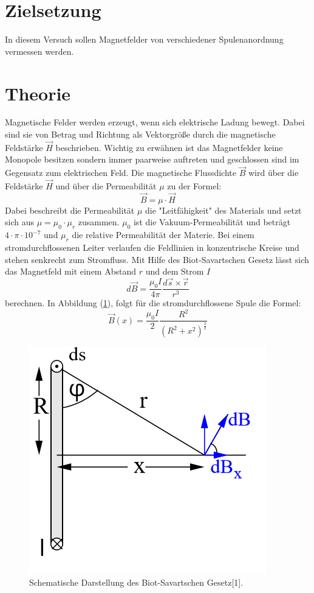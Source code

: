 \section{Zielsetzung}
In diesem Versuch sollen Magnetfelder von verschiedener Spulenanordnung vermessen werden.
\section{Theorie}
Magnetische Felder werden erzeugt, wenn sich elektrische Ladung bewegt.
Dabei sind sie von Betrag und Richtung als Vektorgröße durch die magnetische Feldstärke
$\vec{H}$ beschrieben. Wichtig zu erwähnen ist das Magnetfelder keine Monopole besitzen
sondern immer paarweise auftreten und geschlossen sind im Gegensatz zum elektrischen Feld.
Die magnetische Flussdichte $\vec{B}$ wird über die Feldstärke $\vec{H}$ und über die
Permeabilität $\mu$ zu der Formel:
\begin{equation}
  \vec{B} = \mu \cdot \vec{H}
  \label{eq:1}
\end{equation}
Dabei beschreibt die Permeabilität $\mu$ die "Leitfähigkeit" des Materials und setzt sich
aus $\mu = \mu_0 \cdot \mu_r$ zusammen. $\mu_0$ ist die Vakuum-Permeabilität und beträgt $4 \cdot \pi \cdot 10^{-7}$
und $\mu_r$ die relative Permeabilität der Materie.
Bei einem stromdurchflossenen Leiter verlaufen die Feldlinien in konzentrische Kreise und
stehen senkrecht zum Stromfluss. Mit Hilfe des Biot-Savartschen Gesetz lässt sich
das Magnetfeld mit einem Abstand $r$ und dem Strom $I$
\begin{equation*}
  d\vec{B} = \frac{\mu_0 I}{4\pi} \frac{d\vec{s} \times \vec{r}}{r^3}
\end{equation*}
berechnen. In Abbildung (\ref{abb:1}), folgt für die stromdurchflossene Spule die Formel:
\begin{equation}
  \vec{B}(x) = \frac{\mu_0 I}{2} \frac{R^2}{(R^2 + x^2)^{\frac{3}{2}}}
  \label{eq:2}
\end{equation}
\begin{figure}[H]
  \centering
  \includegraphics[width=5 cm , height=3.5 cm]{Abb1.png}
	\caption{Schematische Darstellung des Biot-Savartschen Gesetz[1].}
	\label{abb:1}
\end{figure}
